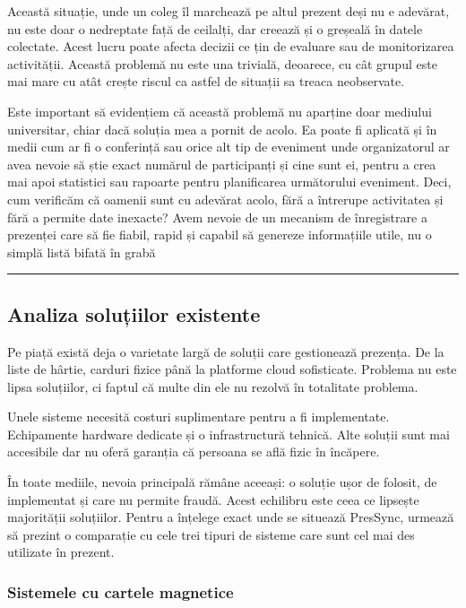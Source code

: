 \documentclass[11pt]{article}
\begin{document}
Această situație, unde un coleg îl marchează pe altul prezent deși nu e adevărat, nu este doar o nedreptate față de ceilalți, dar creează și o greșeală în datele colectate. Acest lucru poate afecta decizii ce țin de evaluare sau de monitorizarea activității. Această problemă nu este una trivială, deoarece, cu cât grupul este mai mare cu atât crește riscul ca astfel de situații sa treaca neobservate.

Este important să evidențiem că această problemă nu aparține doar mediului universitar, chiar dacă soluția mea a pornit de acolo. Ea poate fi aplicată și în medii cum ar fi o conferință sau orice alt tip de eveniment unde organizatorul ar avea nevoie să știe exact numărul de participanți și cine sunt ei, pentru a crea mai apoi statistici sau rapoarte pentru planificarea următorului eveniment. Deci, cum verificăm că oamenii sunt cu adevărat acolo, fără a întrerupe activitatea și fără a permite date inexacte? Avem nevoie de un mecanism de înregistrare a prezenței care să fie fiabil, rapid și capabil să genereze informațiile utile, nu o simplă listă bifată în grabă

\noindent\rule{\textwidth}{0.4pt}

\subsection{Analiza soluțiilor existente}

Pe piață există deja o varietate largă de soluții care gestionează prezența. De la liste de hârtie, carduri fizice până la platforme cloud sofisticate.
Problema nu este lipsa soluțiilor, ci faptul că multe din ele nu rezolvă în totalitate problema.

Unele sisteme necesită costuri suplimentare pentru a fi implementate. Echipamente hardware dedicate și o infrastructură tehnică.
Alte soluții sunt mai accesibile dar nu oferă garanția că persoana se află fizic în încăpere.

În toate mediile, nevoia principală rămâne aceeași: o soluție ușor de folosit, de implementat și care nu permite fraudă. Acest echilibru este ceea ce lipsește majorității soluțiilor.
Pentru a înțelege exact unde se situează PresSync, urmează să prezint o comparație cu cele trei tipuri de sisteme care sunt cel mai des utilizate în prezent.
\subsubsection{Sistemele cu cartele magnetice}
\end{document}

